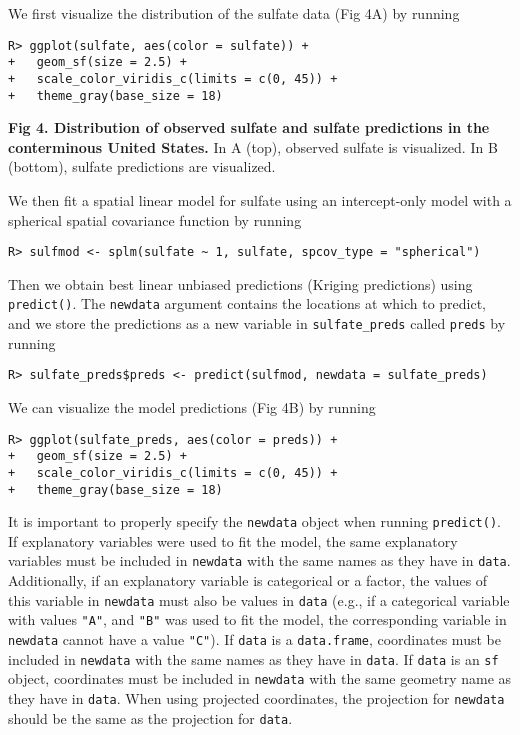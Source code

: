 \documentclass[10pt,letterpaper]{article}
\begin{document}
We first visualize the distribution of the sulfate data (Fig 4A) by
running

\begin{verbatim}
R> ggplot(sulfate, aes(color = sulfate)) +
+   geom_sf(size = 2.5) +
+   scale_color_viridis_c(limits = c(0, 45)) +
+   theme_gray(base_size = 18)
\end{verbatim}

\textbf{Fig 4. Distribution of observed sulfate and sulfate predictions
in the conterminous United States.} In A (top), observed sulfate is
visualized. In B (bottom), sulfate predictions are visualized.

We then fit a spatial linear model for sulfate using an intercept-only
model with a spherical spatial covariance function by running

\begin{verbatim}
R> sulfmod <- splm(sulfate ~ 1, sulfate, spcov_type = "spherical")
\end{verbatim}

\noindent Then we obtain best linear unbiased predictions (Kriging
predictions) using \texttt{predict()}. The \texttt{newdata} argument
contains the locations at which to predict, and we store the predictions
as a new variable in \texttt{sulfate\_preds} called \texttt{preds} by
running

\begin{verbatim}
R> sulfate_preds$preds <- predict(sulfmod, newdata = sulfate_preds)
\end{verbatim}

\noindent We can visualize the model predictions (Fig 4B) by running

\begin{verbatim}
R> ggplot(sulfate_preds, aes(color = preds)) +
+   geom_sf(size = 2.5) +
+   scale_color_viridis_c(limits = c(0, 45)) +
+   theme_gray(base_size = 18)
\end{verbatim}

It is important to properly specify the \texttt{newdata} object when
running \texttt{predict()}. If explanatory variables were used to fit
the model, the same explanatory variables must be included in
\texttt{newdata} with the same names as they have in \texttt{data}.
Additionally, if an explanatory variable is categorical or a factor, the
values of this variable in \texttt{newdata} must also be values in
\texttt{data} (e.g., if a categorical variable with values \texttt{"A"},
and \texttt{"B"} was used to fit the model, the corresponding variable
in \texttt{newdata} cannot have a value \texttt{"C"}). If \texttt{data}
is a \texttt{data.frame}, coordinates must be included in
\texttt{newdata} with the same names as they have in \texttt{data}. If
\texttt{data} is an \texttt{sf} object, coordinates must be included in
\texttt{newdata} with the same geometry name as they have in
\texttt{data}. When using projected coordinates, the projection for
\texttt{newdata} should be the same as the projection for \texttt{data}.
\end{document}
